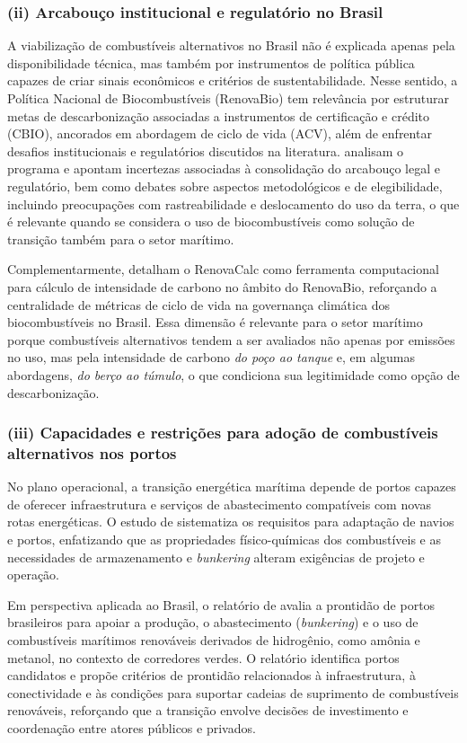 \subsubsection{(ii) Arcabouço institucional e regulatório no Brasil}
A viabilização de combustíveis alternativos no Brasil não é explicada apenas pela disponibilidade técnica, mas também por instrumentos de política pública capazes de criar sinais econômicos e critérios de sustentabilidade. Nesse sentido, a Política Nacional de Biocombustíveis (RenovaBio) tem relevância por estruturar metas de descarbonização associadas a instrumentos de certificação e crédito (\gls{CBIO}), ancorados em abordagem de ciclo de vida (\gls{ACV}), além de enfrentar desafios institucionais e regulatórios discutidos na literatura. \citet{grangeia_brazilian_2022} analisam o programa e apontam incertezas associadas à consolidação do arcabouço legal e regulatório, bem como debates sobre aspectos metodológicos e de elegibilidade, incluindo preocupações com rastreabilidade e deslocamento do uso da terra, o que é relevante quando se considera o uso de biocombustíveis como solução de transição também para o setor marítimo.

Complementarmente, \citet{pereira_renovacalc_2025} detalham o RenovaCalc como ferramenta computacional para cálculo de intensidade de carbono no âmbito do RenovaBio, reforçando a centralidade de métricas de ciclo de vida na governança climática dos biocombustíveis no Brasil. Essa dimensão é relevante para o setor marítimo porque combustíveis alternativos tendem a ser avaliados não apenas por emissões no uso, mas pela intensidade de carbono \emph{do poço ao tanque} e, em algumas abordagens, \emph{do berço ao túmulo}, o que condiciona sua legitimidade como opção de descarbonização.

\subsubsection{(iii) Capacidades e restrições para adoção de combustíveis alternativos nos portos}
No plano operacional, a transição energética marítima depende de portos capazes de oferecer infraestrutura e serviços de abastecimento compatíveis com novas rotas energéticas. O estudo de \citet{wei_evaluating_2023} sistematiza os requisitos para adaptação de navios e portos, enfatizando que as propriedades físico-químicas dos combustíveis e as necessidades de armazenamento e \emph{bunkering} alteram exigências de projeto e operação.

Em perspectiva aplicada ao Brasil, o relatório de \citet{icct_hubs_2025} avalia a prontidão de portos brasileiros para apoiar a produção, o abastecimento (\emph{bunkering}) e o uso de combustíveis marítimos renováveis derivados de hidrogênio, como amônia e metanol, no contexto de corredores verdes. O relatório identifica portos candidatos e propõe critérios de prontidão relacionados à infraestrutura, à conectividade e às condições para suportar cadeias de suprimento de combustíveis renováveis, reforçando que a transição envolve decisões de investimento e coordenação entre atores públicos e privados.

